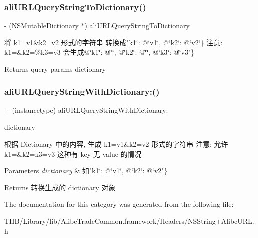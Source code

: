 \subsubsection{\texorpdfstring{ali\+U\+R\+L\+Query\+String\+To\+Dictionary()}{aliURLQueryStringToDictionary()}}
{\footnotesize\ttfamily -\/ (N\+S\+Mutable\+Dictionary $\ast$) ali\+U\+R\+L\+Query\+String\+To\+Dictionary \begin{DoxyParamCaption}{ }\end{DoxyParamCaption}}

将 k1=v1\&k2=v2 形式的字符串 转换成"k1\char`\"{}\+: @\char`\"{}v1\char`\"{}, @\char`\"{}k2\char`\"{}\+: @\char`\"{}v2\char`\"{}\}
注意\+: k1=\&k2=\%k3=v3 会生成@\char`\"{}k1\char`\"{}\+: @\char`\"{}\char`\"{}, @\char`\"{}k2\char`\"{}\+: @\char`\"{}\char`\"{}, @\char`\"{}k3\char`\"{}\+: @\char`\"{}v3"\}

\begin{DoxyReturn}{Returns}
query params dictionary 
\end{DoxyReturn}
\mbox{\label{category_n_s_string_07_alibc_u_r_l_08_ad1e52926288baf29ab9d4c137202d6a2}} 
\subsubsection{\texorpdfstring{ali\+U\+R\+L\+Query\+String\+With\+Dictionary\+:()}{aliURLQueryStringWithDictionary:()}}
{\footnotesize\ttfamily + (instancetype) ali\+U\+R\+L\+Query\+String\+With\+Dictionary\+: \begin{DoxyParamCaption}\item[{(N\+S\+Dictionary $\ast$)}]{dictionary }\end{DoxyParamCaption}}

根据 Dictionary 中的内容, 生成 k1=v1\&k2=v2 形式的字符串 注意\+: 允许 k1=\&k2=k3=v3 这种有 key 无 value 的情况


\begin{DoxyParams}{Parameters}
{\em dictionary} & 如"k1\char`\"{}\+: @\char`\"{}v1\char`\"{}, @\char`\"{}k2\char`\"{}\+: @\char`\"{}v2"\}\\
\hline
\end{DoxyParams}
\begin{DoxyReturn}{Returns}
转换生成的 dictionary 对象 
\end{DoxyReturn}


The documentation for this category was generated from the following file\+:\begin{DoxyCompactItemize}
\item 
T\+H\+B/\+Library/lib/\+Alibc\+Trade\+Common.\+framework/\+Headers/N\+S\+String+\+Alibc\+U\+R\+L.\+h\end{DoxyCompactItemize}
